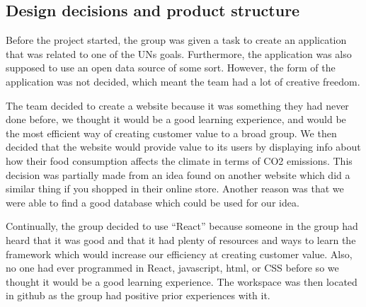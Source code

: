 \subsection{Design decisions and product structure}

Before the project started, the group was given a task to create an application that was related to one of the UNs goals. Furthermore, the application was also supposed to use an open data source of some sort. However, the form of the application was not decided, which meant the team had a lot of creative freedom. 

The team decided to create a website because it was something they had never done before, we thought it would be a good learning experience, and would be the most efficient way of creating customer value to a broad group. We then decided that the website would provide value to its users by displaying info about how their food consumption affects the climate in terms of CO2 emissions. This decision was partially made from an idea found on another website which did a similar thing if you shopped in their online store. Another reason was that we were able to find a good database which could be used for our idea\cite{Data}.

Continually, the group decided to use “React” because someone in the group had heard that it was good and that it had plenty of resources and ways to learn the framework which would increase our efficiency at creating customer value. Also, no one had ever programmed in React, javascript, html, or CSS before so we thought it would be a good learning experience. The workspace was then located in github as the group had positive prior experiences with it.


